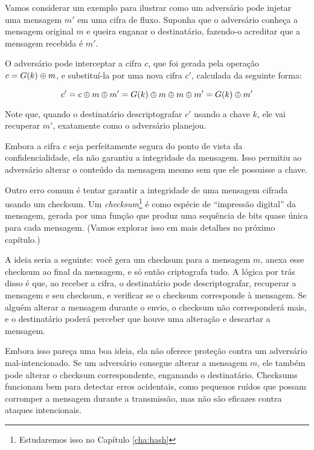 \begin{example}
Vamos considerar um exemplo para ilustrar como um adversário pode injetar uma mensagem $m'$ em uma cifra de fluxo.
Suponha que o adversário conheça a mensagem original $m$ e queira enganar o destinatário, fazendo-o acreditar que a mensagem recebida é $m'$.

O adversário pode interceptar a cifra $c$, que foi gerada pela operação $c = G(k) \oplus m$, e substituí-la por uma nova cifra $c'$, calculada da seguinte forma:

\begin{displaymath}
c' = c \oplus m \oplus m' = G(k) \oplus m \oplus m \oplus m' = G(k) \oplus m'
\end{displaymath}

Note que, quando o destinatário descriptografar $c'$ usando a chave $k$, ele vai recuperar $m'$, exatamente como o adversário planejou.

Embora a cifra $c$ seja perfeitamente segura do ponto de vista da confidencialidade, ela não garantiu a integridade da mensagem.
Isso permitiu ao adversário alterar o conteúdo da mensagem mesmo sem que ele possuisse a chave.
\end{example}

\begin{example}
  Outro erro comum é tentar garantir a integridade de uma mensagem cifrada usando um checksum.
  Um {\em checksum}\footnote{Estudaremos isso no Capítulo \ref{cha:hash}} é como espécie de ``impressão digital'' da mensagem, gerada por uma função que produz uma sequência de bits quase única para cada mensagem.
(Vamos explorar isso em mais detalhes no próximo capítulo.)

A ideia seria a seguinte: você gera um checksum para a mensagem $m$, anexa esse checksum ao final da mensagem, e só então criptografa tudo.
A lógica por trás disso é que, ao receber a cifra, o destinatário pode descriptografar, recuperar a mensagem e seu checksum, e verificar se o checksum corresponde à mensagem.
Se alguém alterar a mensagem durante o envio, o checksum não corresponderá mais, e o destinatário poderá perceber que houve uma alteração e descartar a mensagem.

Embora isso pareça uma boa ideia, ela não oferece proteção contra um adversário mal-intencionado.
Se um adversário consegue alterar a mensagem $m$, ele também pode alterar o checksum correspondente, enganando o destinatário.
Checksums funcionam bem para detectar erros acidentais, como pequenos ruídos que possam corromper a mensagem durante a transmissão, mas não são eficazes contra ataques intencionais.

\end{example}

